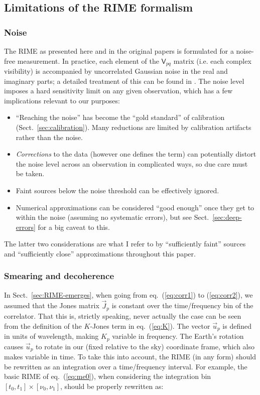 \documentclass[]{aa}
\newcommand{\jones}[2]{\vec {#1}_{#2}}
\newcommand{\coh}[2]{\mathsf{{#1}}_{{#2}}}
\begin{document}
\subsection{Limitations of the RIME formalism\label{sec:rime-limitations}}

\subsubsection{\label{sec:noise}Noise}

The RIME as presented here and in the original papers is formulated for a noise-free measurement. In practice, each element of the $\coh{V}{pq}$ matrix (i.e. each complex visibility) is accompanied by uncorrelated Gaussian noise in the real and imaginary parts; a detailed treatment of this can be found in \citet[Sect.~6.2]{tms}. The noise level imposes a hard sensitivity limit on any given observation, which has a few implications relevant to our purposes:

\begin{itemize}
\item ``Reaching the noise'' has become the ``gold standard'' of calibration (Sect.~\ref{sec:calibration}). 
Many reductions are limited by calibration artifacts rather than the noise.
\item {\em Corrections} to the data (however one defines the term) can potentially distort the noise level across an observation in complicated ways, so due care must be taken.
\item Faint sources below the noise threshold can be effectively ignored.
\item Numerical approximations can be considered ``good enough'' once they get to within the noise (assuming no systematic errors), but see Sect.~\ref{sec:deep-errors} for a big caveat to this.
\end{itemize}

The latter two considerations are what I refer to by ``sufficiently faint'' sources and ``sufficiently close'' approximations throughout this paper.

\subsubsection{\label{sec:smearing}Smearing and decoherence}

In Sect.~\ref{sec:RIME-emerges}, when going from eq.~(\ref{eq:corr1}) to (\ref{eq:corr2}), we assumed that the Jones matrix $\jones{J}{p}$ is constant over the time/frequency bin of the correlator. That this is, strictly speaking, never actually the case can be seen from the definition of the $K$-Jones term in eq.~(\ref{eq:K}). The vector $\vec u_p$ is defined in units of wavelength, making $K_p$ variable in frequency. The Earth's rotation causes $\vec u_p$ to rotate in our (fixed relative to the sky) coordinate frame, which also makes variable in time. To take this into account, the RIME (in any form) should be rewritten as an integration over a time/frequency interval. For example, the basic RIME of eq.~(\ref{eq:me0}), when considering the integration bin $[t_0,t_1]\times[\nu_0,\nu_1]$, should be properly rewritten as:
\end{document}
